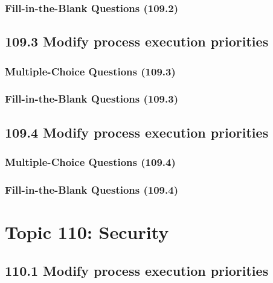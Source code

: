 \documentclass[a4paper]{report}
\begin{document}
\subsubsection*{Fill-in-the-Blank Questions (109.2)}

\subsection*{109.3 Modify process execution priorities}
\subsubsection*{Multiple-Choice Questions (109.3)}

\subsubsection*{Fill-in-the-Blank Questions (109.3)}

\subsection*{109.4 Modify process execution priorities}
\subsubsection*{Multiple-Choice Questions (109.4)}

\subsubsection*{Fill-in-the-Blank Questions (109.4)}


\section*{Topic 110: Security}

\subsection*{110.1 Modify process execution priorities}
\end{document}
